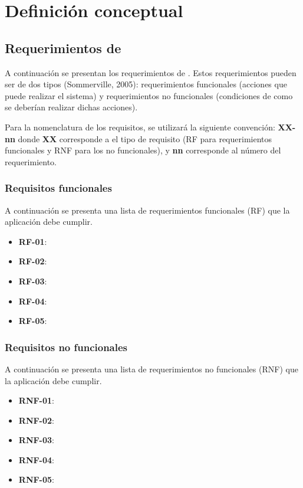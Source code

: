 \section{Definición conceptual}

\subsection{Requerimientos de }
A continuación se presentan los requerimientos de . Estos requerimientos pueden ser de dos tipos (Sommerville, 2005): requerimientos funcionales (acciones que puede realizar el sistema) y requerimientos no funcionales (condiciones de como se deberían realizar dichas acciones).

Para la nomenclatura de los requisitos, se utilizará la siguiente convención: \textbf{XX-nn} donde \textbf{XX} corresponde a el tipo de requisito (RF para requerimientos funcionales y RNF para los no funcionales), y \textbf{nn} corresponde al número del requerimiento.

\subsubsection*{Requisitos funcionales}
A continuación se presenta una lista de requerimientos funcionales (RF) que la aplicación debe cumplir. 


\begin{itemize}
\item \textbf{RF-01}:
\item \textbf{RF-02}:
\item \textbf{RF-03}:
\item \textbf{RF-04}:
\item \textbf{RF-05}:
\end{itemize}

\subsubsection*{Requisitos no funcionales}
A continuación se presenta una lista de requerimientos no funcionales (RNF) que la aplicación debe cumplir. 

\begin{itemize}
\item \textbf{RNF-01}:
\item \textbf{RNF-02}:
\item \textbf{RNF-03}:
\item \textbf{RNF-04}:
\item \textbf{RNF-05}:
\end{itemize}

